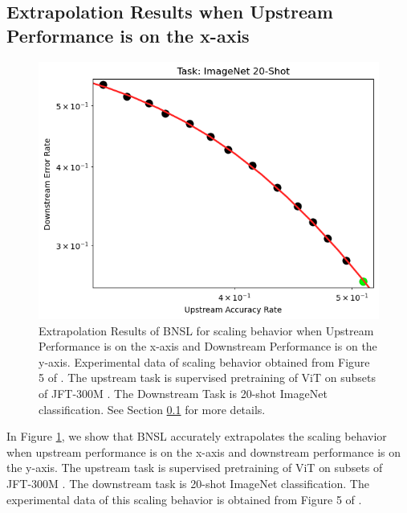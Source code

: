 \documentclass{article} %
\begin{document}
\clearpage

\subsection{Extrapolation Results when Upstream Performance is on the x-axis}
\label{section:downstream_from_upstream}

\begin{figure}[htbp]
    \centering
\includegraphics[width=1.0\textwidth]{figures/downstream_from_upstream/Task_ImageNet_20-shot.png}

    \caption{
    Extrapolation Results of BNSL for scaling behavior when Upstream Performance is on the x-axis and Downstream Performance is on the y-axis. Experimental data of scaling behavior obtained from Figure 5 of \cite{abnar2021exploring}. The upstream task is supervised pretraining of ViT \citep{dosovitskiy2020image} on subsets of JFT-300M \citep{sun2017revisiting}. The Downstream Task is 20-shot ImageNet classification. See Section \ref{section:downstream_from_upstream} for more details.
    }
    \label{fig:downstream_from_upstream}
\end{figure}

In Figure \ref{fig:downstream_from_upstream}, we show that BNSL accurately extrapolates the scaling behavior when upstream performance is on the x-axis and downstream performance is on the y-axis. The upstream task is supervised pretraining of ViT \citep{dosovitskiy2020image} on subsets of JFT-300M \citep{sun2017revisiting}. The downstream task is 20-shot ImageNet classification. The experimental data of this scaling behavior is obtained from Figure 5 of \cite{abnar2021exploring}.
\end{document}
